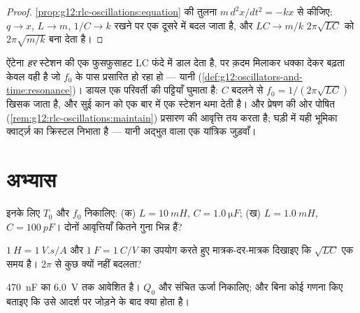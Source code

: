 \begin{proof}
\cref{prop:g12:rlc-oscillations:equation} की तुलना $m\,d^2x/dt^2 = -kx$ से कीजिए: $q \to x$, $L \to m$, $1/C \to k$ रखने पर एक दूसरे
में बदल जाता है, और $LC \to m/k$ $2\pi\sqrt{LC}$ को $2\pi\sqrt{m/k}$ बना देता है।
\end{proof}

\begin{example}[रेडियो सुर में बिठाना]\label{ex:g12:rlc-oscillations:tuning}
ऐंटेना \emph{हर} स्टेशन की एक फुसफुसाहट LC फंदे में डाल देता है, पर क़दम मिलाकर
धक्का देकर बढ़ता केवल वही है जो $f_0$ के पास प्रसारित हो रहा हो --- यानी
 (\cref{def:g12:oscillators-and-time:resonance})। डायल एक परिवर्ती  की पट्टियाँ
घुमाता है: $C$ बदलने से $f_0 = 1/(2\pi\sqrt{LC})$ खिसक जाता है, और सुई कान को एक बार में एक
स्टेशन थमा देती है। और प्रेषण की ओर पोषित  (\cref{rem:g12:rlc-oscillations:maintain}) प्रसारण
की आवृत्ति तय करता है; घड़ी में यही भूमिका क्वार्ट्ज़ का क्रिस्टल
निभाता है --- यानी अद्भुत  वाला एक यांत्रिक जुड़वाँ।
\end{example}

\section{अभ्यास}

\begin{exercise}[$\star$]\label{exo:g12:rlc-oscillations:1}
इनके लिए $T_0$ और $f_0$ निकालिए: (क) $L = \qty{10}{mH}$, $C = \qty{1.0}{\micro F}$; (ख) $L = \qty{1.0}{mH}$,
$C = \qty{100}{pF}$। दोनों आवृत्तियाँ कितने गुना भिन्न हैं?
\end{exercise}

\begin{exercise}[$\star$]\label{exo:g12:rlc-oscillations:2}
$\qty{1}{H} = \qty{1}{V.s/A}$ और $\qty{1}{F} = \qty{1}{C/V}$ का उपयोग करते हुए मात्रक-दर-मात्रक
दिखाइए कि $\sqrt{LC}$ एक समय है। $2\pi$ से कुछ क्यों नहीं बदलता?
\end{exercise}

\begin{exercise}[$\star$]\label{exo:g12:rlc-oscillations:3}
\qty{470}{nF} का  \qty{6.0}{V} तक आवेशित है। $Q_0$ और संचित
ऊर्जा निकालिए; और बिना कोई गणना किए बताइए कि उसे आदर्श 
पर जोड़ने के बाद क्या होता है।
\end{exercise}

